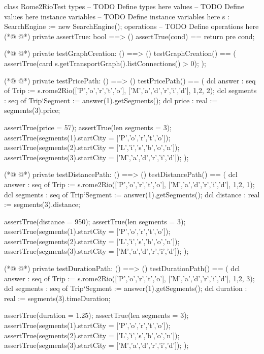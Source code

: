 \begin{vdmpp}[breaklines=true]
class Rome2RioTest
types
-- TODO Define types here
values
-- TODO Define values here
instance variables
-- TODO Define instance variables here
  s : SearchEngine := new SearchEngine();
operations
-- TODO Define operations here
(*@
\label{assertTrue:11}
@*)
  private assertTrue: bool ==> ()
    assertTrue(cond) == return
    pre cond;

(*@
\label{testGraphCreation:15}
@*)
    private testGraphCreation: () ==> ()
    testGraphCreation() == (
      assertTrue(card s.getTransportGraph().listConnections() > 0);
    );
    
(*@
\label{testPricePath:20}
@*)
    private testPricePath: () ==> ()
    testPricePath() == (
      dcl answer : seq of Trip := s.rome2Rio(['P','o','r','t','o'], ['M','a','d','r','i','d'], {1,2}, 2);
      dcl segments : seq of Trip`Segment := answer(1).getSegments();
      dcl price : real := segments(3).price;
     
      assertTrue(price = 57);
      assertTrue(len segments = 3);
      assertTrue(segments(1).startCity = ['P','o','r','t','o']);
      assertTrue(segments(2).startCity = ['L','i','s','b','o','n']);
      assertTrue(segments(3).startCity = ['M','a','d','r','i','d']);
    );
    
(*@
\label{testDistancePath:33}
@*)
    private testDistancePath: () ==> ()
    testDistancePath() == (
      dcl answer : seq of Trip := s.rome2Rio(['P','o','r','t','o'], ['M','a','d','r','i','d'], {1,2}, 1);
      dcl segments : seq of Trip`Segment := answer(1).getSegments();
      dcl distance : real := segments(3).distance;
      
      assertTrue(distance = 950);
      assertTrue(len segments = 3);
      assertTrue(segments(1).startCity = ['P','o','r','t','o']);
      assertTrue(segments(2).startCity = ['L','i','s','b','o','n']);
      assertTrue(segments(3).startCity = ['M','a','d','r','i','d']);
    );
    
(*@
\label{testDurationPath:46}
@*)
    private testDurationPath: () ==> ()
    testDurationPath() == (
      dcl answer : seq of Trip := s.rome2Rio(['P','o','r','t','o'], ['M','a','d','r','i','d'], {1,2}, 3);
      dcl segments : seq of Trip`Segment := answer(1).getSegments();
      dcl duration : real := segments(3).timeDuration;
      
      assertTrue(duration = 1.25);
      assertTrue(len segments = 3);
      assertTrue(segments(1).startCity = ['P','o','r','t','o']);
      assertTrue(segments(2).startCity = ['L','i','s','b','o','n']);
      assertTrue(segments(3).startCity = ['M','a','d','r','i','d']);
    );
    

\end{vdmpp}
